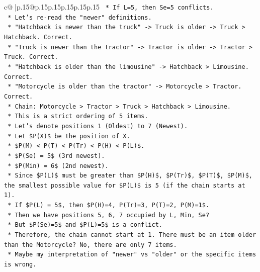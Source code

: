 \documentclass{article}
\begin{document}
{\begin{supertabular}{c@{$\;$}|p{.15\linewidth}@{}p{.15\linewidth}p{.15\linewidth}p{.15\linewidth}p{.15\linewidth}p{.15\linewidth}}
{{{\texttt{                    *   If L=5, then Se=5 conflicts.} \\
\texttt{                    *   Let's re{-}read the "newer" definitions.} \\
\texttt{                    *   "Hatchback is newer than the truck" {-}> Truck is older {-}> Truck > Hatchback. Correct.} \\
\texttt{                    *   "Truck is newer than the tractor" {-}> Tractor is older {-}> Tractor > Truck. Correct.} \\
\texttt{                    *   "Hatchback is older than the limousine" {-}> Hatchback > Limousine. Correct.} \\
\texttt{                    *   "Motorcycle is older than the tractor" {-}> Motorcycle > Tractor. Correct.} \\
\texttt{                    *   Chain: Motorcycle > Tractor > Truck > Hatchback > Limousine.} \\
\texttt{                    *   This is a strict ordering of 5 items.} \\
\texttt{                    *   Let's denote positions 1 (Oldest) to 7 (Newest).} \\
\texttt{                    *   Let \$P(X)\$ be the position of X.} \\
\texttt{                    *   \$P(M) < P(T) < P(Tr) < P(H) < P(L)\$.} \\
\texttt{                    *   \$P(Se) = 5\$ (3rd newest).} \\
\texttt{                    *   \$P(Min) = 6\$ (2nd newest).} \\
\texttt{                    *   Since \$P(L)\$ must be greater than \$P(H)\$, \$P(Tr)\$, \$P(T)\$, \$P(M)\$, the smallest possible value for \$P(L)\$ is 5 (if the chain starts at 1).} \\
\texttt{                    *   If \$P(L) = 5\$, then \$P(H)=4, P(Tr)=3, P(T)=2, P(M)=1\$.} \\
\texttt{                    *   Then we have positions 5, 6, 7 occupied by L, Min, Se?} \\
\texttt{                    *   But \$P(Se)=5\$ and \$P(L)=5\$ is a conflict.} \\
\texttt{                    *   Therefore, the chain cannot start at 1. There must be an item older than the Motorcycle? No, there are only 7 items.} \\
\texttt{                    *   Maybe my interpretation of "newer" vs "older" or the specific items is wrong.} \\
}}}
\end{supertabular}}
\end{document}
